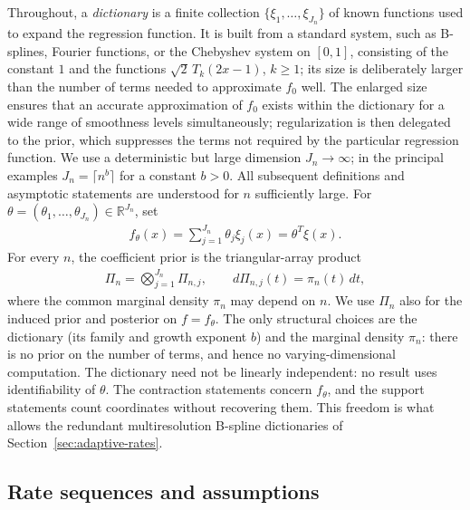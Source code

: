 Throughout, a \emph{dictionary} is a finite collection $\{\xi_1,\ldots,\xi_{J_n}\}$ of known functions used to expand the regression function. It is built from a standard system, such as B-splines, Fourier functions, or the Chebyshev system on $[0,1]$, consisting of the constant $1$ and the functions $\sqrt2\,T_k(2x-1)$, $k\geq1$; its size is deliberately larger than the number of terms needed to approximate $f_0$ well. The enlarged size ensures that an accurate approximation of $f_0$ exists within the dictionary for a wide range of smoothness levels simultaneously; regularization is then delegated to the prior, which suppresses the terms not required by the particular regression function. We use a deterministic but large dimension $J_n\to\infty$; in the principal examples $J_n=\lceil n^b\rceil$ for a constant $b>0$. All subsequent definitions and asymptotic statements are understood for $n$ sufficiently large. For $\theta=(\theta_1,\ldots,\theta_{J_n})\in\mathbb{R}^{J_n}$, set
\begin{align*}
f_\theta(x)=\sum_{j=1}^{J_n}\theta_j\xi_j(x)=\theta^T\xi(x).
\end{align*}
For every $n$, the coefficient prior is the triangular-array product
\begin{align*}
\Pi_n=\bigotimes_{j=1}^{J_n}\Pi_{n,j},
\qquad d\Pi_{n,j}(t)=\pi_n(t)\,dt,
\end{align*}
where the common marginal density $\pi_n$ may depend on $n$. We use $\Pi_n$ also for the induced prior and posterior on $f=f_\theta$. The only structural choices are the dictionary (its family and growth exponent $b$) and the marginal density $\pi_n$: there is no prior on the number of terms, and hence no varying-dimensional computation. The dictionary need not be linearly independent: no result uses identifiability of $\theta$. The contraction statements concern $f_\theta$, and the support statements count coordinates without recovering them. This freedom is what allows the redundant multiresolution B-spline dictionaries of Section~\ref{sec:adaptive-rates}.

\subsection{Rate sequences and assumptions}\label{sec:rates-assumptions}

